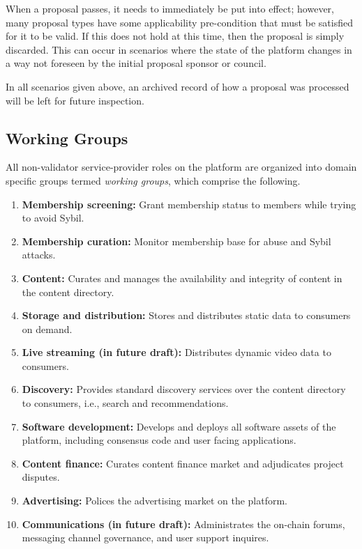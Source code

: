 \documentclass{article}
\begin{document}
When a proposal passes, it needs to immediately be put into effect; however, many proposal types have some applicability pre-condition that must be satisfied for it to be valid. If this does not hold at this time, then the proposal is simply discarded. This can occur in scenarios where the state of the platform changes in a way not foreseen by the initial proposal sponsor or council.

In all scenarios given above, an archived record of how a proposal was processed will be left for future inspection.


\subsection{Working Groups} \label{sec:working_groups}

All non-validator service-provider roles on the platform are organized into domain specific groups termed \textit{working groups}, which comprise the following.

\begin{enumerate}
  \item \textbf{Membership screening:} Grant membership status to members while trying to avoid Sybil.
  \item \textbf{Membership curation:} Monitor membership base for abuse and Sybil attacks.
  \item \textbf{Content:} Curates and manages the availability and integrity of content in the content directory.
  \item \textbf{Storage and distribution:} Stores and distributes static data to consumers on demand.
  \item \textbf{Live streaming (in future draft):} Distributes dynamic video data to consumers.
  \item \textbf{Discovery:} Provides standard discovery services over the content directory to consumers, i.e., search and recommendations.
  \item \textbf{Software development:} Develops and deploys all software assets of the platform, including consensus code and user facing applications.
  \item \textbf{Content finance:} Curates content finance market and adjudicates project disputes.
  \item \textbf{Advertising:} Polices the advertising market on the platform.
  \item \textbf{Communications (in future draft):} Administrates the on-chain forums, messaging channel governance, and user support inquires.
\end{enumerate}
\end{document}
